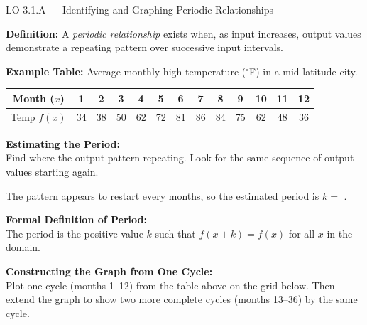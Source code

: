 \documentclass[10pt]{article}
\begin{document}
\begin{notesbox}{LO 3.1.A --- Identifying and Graphing Periodic Relationships}

\textbf{Definition:} A \emph{periodic relationship} exists when, as input
increases, output values demonstrate a repeating pattern over successive
\underline{\hspace{3cm}} input intervals.

\vspace{8pt}
\textbf{Example Table:} Average monthly high temperature (${}^\circ$F) in a
mid-latitude city.

\vspace{4pt}
\begin{center}
\renewcommand{\arraystretch}{1.35}
\begin{tabular}{|c|c|c|c|c|c|c|c|c|c|c|c|c|}
\hline
Month ($x$) & 1 & 2 & 3 & 4 & 5 & 6 & 7 & 8 & 9 & 10 & 11 & 12 \\
\hline
Temp $f(x)$ & 34 & 38 & 50 & 62 & 72 & 81 & 86 & 84 & 75 & 62 & 48 & 36 \\
\hline
\end{tabular}
\end{center}

\vspace{6pt}
\textbf{Estimating the Period:}\\
Find where the output pattern \underline{\hspace{2.5cm}} repeating.
Look for the same sequence of output values starting again.

\vspace{4pt}
The pattern appears to restart every \underline{\hspace{1.5cm}} months,
so the estimated period is $k = $ \underline{\hspace{1.5cm}}.

\vspace{8pt}
\textbf{Formal Definition of Period:}\\
The period is the \underline{\hspace{2cm}} positive value $k$ such that
$f(x + k) = f(x)$ for all $x$ in the domain.

\vspace{8pt}
\textbf{Constructing the Graph from One Cycle:}\\
Plot one cycle (months 1--12) from the table above on the grid below.
Then extend the graph to show two more complete cycles (months 13--36)
by \underline{\hspace{4cm}} the same cycle.


\end{notesbox}
\end{document}
